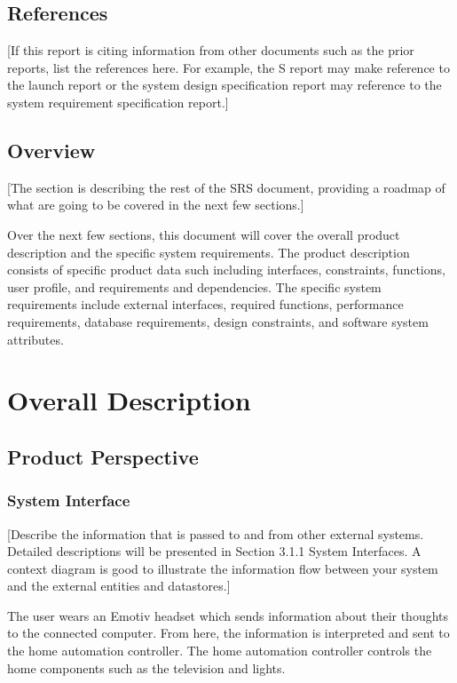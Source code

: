 \documentclass{article}
\begin{document}
\subsection{References}
[If this report is citing information from other documents such as the prior reports, list the references here. 
For example, the S report may make reference to the launch report or the system design specification 
report may reference to the system requirement specification report.]

\subsection{Overview}
[The section is describing the rest of the SRS document, providing a roadmap of what are going to be 
covered in the next few sections.]

Over the next few sections, this document will cover the overall product description and the 
specific system requirements. The product description consists of specific product data such including 
interfaces, constraints, functions, user profile, and requirements and dependencies. The specific system 
requirements include external interfaces, required functions, performance requirements, database 
requirements, design constraints, and software system attributes.

\newpage

\section{Overall Description}

\subsection{Product Perspective}

\subsubsection{System Interface}

[Describe the information that is passed to and from other external systems. Detailed descriptions 
will be presented in Section 3.1.1 System Interfaces. A context diagram is good to illustrate the 
information flow between your system and the external entities and datastores.]

The user wears an Emotiv headset which sends information about their thoughts to the connected computer. From here, the information is interpreted and sent to the home automation controller. The home automation controller controls the home components such as the television and lights. 
\end{document}
